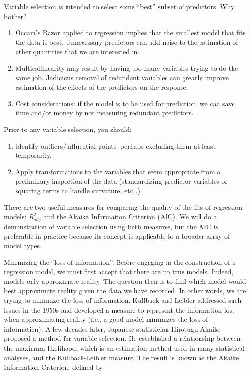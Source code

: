 \documentclass[
]{book}
\begin{document}
Variable selection is intended to select some ``best'' subset of predictors. Why bother?

\begin{enumerate}
\def\labelenumi{\arabic{enumi}.}
\item
  Occam's Razor applied to regression implies that the smallest model that fits the data is best. Unnecessary predictors can add noise to the estimation of other quantities that we are interested in.
\item
  Multicollinearity may result by having too many variables trying to do the same job. Judicious removal of redundant variables can greatly improve estimation of the effects of the predictors on the response.
\item
  Cost considerations: if the model is to be used for prediction, we can save time and/or money by not measuring redundant predictors.
\end{enumerate}

Prior to any variable selection, you should:

\begin{enumerate}
\def\labelenumi{\arabic{enumi}.}
\item
  Identify outliers/influential points, perhaps excluding them at least temporarily.
\item
  Apply transformations to the variables that seem appropriate from a preliminary inspection of the data (standardizing predictor variables or squaring terms to handle curvature, etc\ldots).
\end{enumerate}

There are two useful measures for comparing the quality of the fits of regression models: \(R_{adj}^2\) and the Akaike Information Criterion (AIC). We will do a demonstration of variable selection using both measures, but the AIC is preferable in practice because its concept is applicable to a broader array of model types.

Minimizing the ``loss of information''. Before engaging in the construction of a regression model, we must first accept that there are no true models. Indeed, models only approximate reality. The question then is to find which model would best approximate reality given the data we have recorded. In other words, we are trying to minimize the loss of information. Kullback and Leibler addressed such issues in the 1950s and developed a measure to represent the information lost when approximating reality (i.e., a good model minimizes the loss of information). A few decades later, Japanese statistician Hirotugu Akaike proposed a method for variable selection. He established a relationship between the maximum likelihood, which is an estimation method used in many statistical analyses, and the Kullback-Leibler measure. The result is known as the Akaike Information Criterion, defined by
\end{document}

